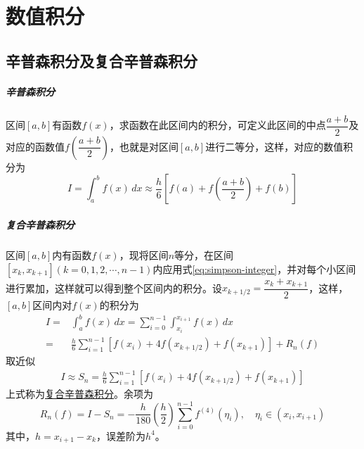 \chapter{数值积分}

\section{辛普森积分及复合辛普森积分}
\paragraph*{辛普森积分} 区间$[a, b]$有函数$f(x)$，求函数在此区间内的积分，可定义此区间的中点$\dfrac{a+b}{2}$及对应的函数值$f(\dfrac{a+b}{2})$，也就是对区间$[a, b]$进行二等分，这样，对应的数值积分为
\begin{equation}
	I = \int_{a}^{b} f(x) \, dx \approx \frac{h}{6}\left[ f(a) + f(\frac{a+b}{2}) + f(b) \right]	\label{eq:simpson-integer}
\end{equation} 

\paragraph*{复合辛普森积分} 区间$[a, b]$内有函数$f(x)$，现将区间$n$等分，在区间$[x_{k}, x_{k+1}](k = 0, 1, 2, \cdots, n-1)$内应用式\eqref{eq:simpson-integer}，并对每个小区间进行累加，这样就可以得到整个区间内的积分。设$x_{k+1/2} = \dfrac{x_k + x_{k+1}}{2}$，这样，$[a, b]$区间内对$f(x)$的积分为
\begin{equation}
    \begin{aligned}
		I =& \int_{a}^{b} f(x) \, dx = \sum_{i = 0}^{n - 1}\int_{x_i}^{x_{i+1}} f(x) \, dx	\\
		=& \frac{h}{6}\sum_{i=1}^{n-1} \left[ f(x_i) + 4f(x_{k+1/2}) + f(x_{k+1})  \right] + R_n(f)
    \end{aligned}
\end{equation} 
取近似
\begin{equation}
    \begin{aligned}
    	I \approx S_n = \frac{h}{6}\sum_{i=1}^{n-1} \left[ f(x_i) + 4f(x_{k+1/2}) + f(x_{k+1})  \right]
    \end{aligned}
\end{equation} 
上式称为\uline{复合辛普森积分}。余项为
\begin{equation}
	R_n(f) = I - S_n = -\frac{h}{180} \left(\frac{h}{2} \right) \sum_{i = 0}^{n-1}f^{(4)}(\eta_i), \quad \eta_i \in (x_i, x_{i+1})
\end{equation} 
其中，$h = x_{i+1} - x_{k}$，误差阶为$h^4$。

